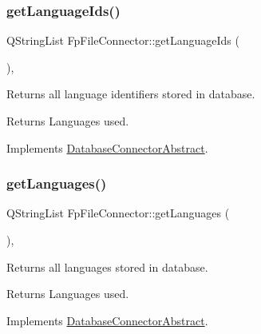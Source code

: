 \subsubsection{\texorpdfstring{get\+Language\+Ids()}{getLanguageIds()}}
{\footnotesize\ttfamily Q\+String\+List Fp\+File\+Connector\+::get\+Language\+Ids (\begin{DoxyParamCaption}{ }\end{DoxyParamCaption})\hspace{0.3cm}{\ttfamily [override]}, {\ttfamily [virtual]}}



Returns all language identifiers stored in database. 

\begin{DoxyReturn}{Returns}
Languages used. 
\end{DoxyReturn}


Implements \mbox{\hyperlink{classDatabaseConnectorAbstract_a98f5b2472bab6edc82ce2c5554319d7f}{Database\+Connector\+Abstract}}.

\mbox{\label{classFpFileConnector_a82b6ae6887737cfea3b982cb0874424e}} 
\subsubsection{\texorpdfstring{get\+Languages()}{getLanguages()}}
{\footnotesize\ttfamily Q\+String\+List Fp\+File\+Connector\+::get\+Languages (\begin{DoxyParamCaption}{ }\end{DoxyParamCaption})\hspace{0.3cm}{\ttfamily [override]}, {\ttfamily [virtual]}}



Returns all languages stored in database. 

\begin{DoxyReturn}{Returns}
Languages used. 
\end{DoxyReturn}


Implements \mbox{\hyperlink{classDatabaseConnectorAbstract_a77ff263d407366e54f3e8512c575ff5e}{Database\+Connector\+Abstract}}.

\mbox{\label{classFpFileConnector_af1a00dabd759abd0b59bf9e26edc73cf}} 
